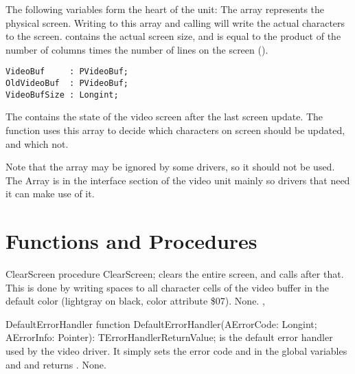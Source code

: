 The following variables form the heart of the  unit: The
 array represents the physical screen. Writing to this
array and calling  will write the actual characters
to the screen.  contains the actual screen size, and is
equal to the product of the number of columns times the number of lines 
on the screen ().
\begin{verbatim}
VideoBuf     : PVideoBuf;
OldVideoBuf  : PVideoBuf;
VideoBufSize : Longint;
\end{verbatim}
The  contains the state of the video screen after the last
screen update. The  function uses this array to decide
which characters on screen should be updated, and which not. 

Note that the  array may be ignored by some drivers, so
it should not be used. The Array is in the interface section of the video
unit mainly so drivers that need it can make use of it. 

\section{Functions and Procedures}

\begin{procedure}{ClearScreen}
\Declaration
procedure ClearScreen; 
\Description
{} clears the entire screen, and calls 
after that. This is done by writing spaces to all character cells of the
video buffer in the default color (lightgray on black, color attribute \$07).
\Errors
None.
\SeeAlso
{}, 
\end{procedure}


\begin{procedure}{DefaultErrorHandler}
\Declaration
function  DefaultErrorHandler(AErrorCode: Longint; AErrorInfo: Pointer): TErrorHandlerReturnValue; 
\Description
{} is the default error handler used by the video
driver. It simply sets the error code  and  
in the global variables  and  and returns 
.
\Errors
None.
\SeeAlso
\end{procedure}

